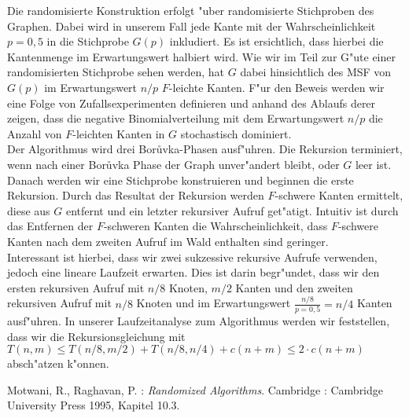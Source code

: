 \documentclass[a4paper,12pt,times,german]{cls/summary}
\begin{document}
Die randomisierte Konstruktion erfolgt "uber randomisierte Stichproben 
    des Graphen.
    Dabei wird in unserem Fall jede Kante mit der Wahrscheinlichkeit $p=0,5$
    in die Stichprobe $G(p)$ inkludiert. 
    Es ist ersichtlich, dass hierbei die Kantenmenge im Erwartungswert
    halbiert wird.
    Wie wir im Teil zur G"ute einer randomisierten Stichprobe sehen werden, 
    hat $G$ dabei hinsichtlich des MSF von $G(p)$ im Erwartungswert $n/p$
    $F$-leichte Kanten. 
    F"ur den Beweis werden wir eine Folge von Zufallsexperimenten definieren
    und anhand des Ablaufs derer zeigen, dass die negative Binomialverteilung
    mit dem Erwartungswert $n/p$ die Anzahl von $F$-leichten Kanten in $G$
    stochastisch dominiert.\\
Der Algorithmus wird drei Bor\r uvka-Phasen ausf"uhren.
    Die Rekursion terminiert, wenn nach einer Bor\r uvka Phase der Graph 
    unver"andert bleibt, oder $G$ leer ist.
    Danach werden wir eine Stichprobe konstruieren und beginnen die erste
    Rekursion.
    Durch das Resultat der Rekursion werden $F$-schwere Kanten ermittelt, 
    diese aus $G$ entfernt und ein letzter rekursiver Aufruf get"atigt.
    Intuitiv ist durch das Entfernen der $F$-schweren Kanten die 
    Wahrscheinlichkeit, dass $F$-schwere Kanten nach dem zweiten Aufruf im 
    Wald enthalten sind geringer.\\
Interessant ist hierbei, dass wir zwei sukzessive rekursive Aufrufe verwenden, jedoch
    eine lineare Laufzeit erwarten.
    Dies ist darin begr"undet, dass wir den ersten rekursiven Aufruf mit 
    $n/8$ Knoten, $m/2$ Kanten und den zweiten rekursiven Aufruf mit $n/8$ Knoten
    und im Erwartungswert
    $\frac{n/8}{p=0,5} = n/4$ Kanten ausf"uhren.
    In unserer Laufzeitanalyse zum Algorithmus werden wir feststellen, dass
    wir die Rekursionsgleichung mit 
    $T(n,m) \leq T(n/8,m/2) + T(n/8, n/4) + c(n+m) \leq 2 \cdot c(n+m)$
    absch"atzen k"onnen.\\
\begin{thebibliography}{}
\footnotesize
{} 
    Motwani, R., Raghavan, P. :
    \textit{Randomized Algorithms}. Cambridge :
    Cambridge University Press 1995, Kapitel 10.3.
\end{thebibliography}
\end{document}

